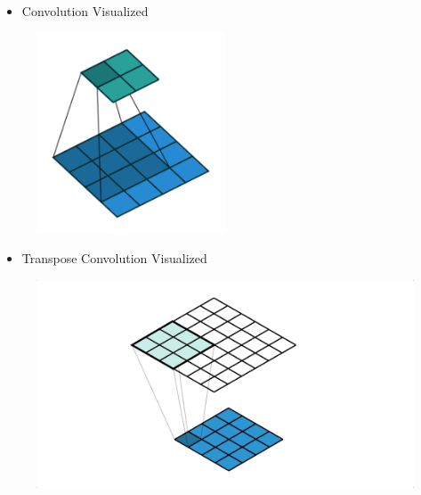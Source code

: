 \begin{frame}[allowframebreaks]

\begin{itemize}
    \item Convolution Visualized
\end{itemize}

\begin{figure}[H]
    \centering
    \includegraphics[width=0.5\textwidth]{.././assets/8.15.gif}
\end{figure}

\begin{itemize}
    \item Transpose Convolution Visualized
\end{itemize}

\begin{figure}[H]
    \centering
    \includegraphics[width=1.0\textwidth]{.././assets/8.16.gif}
\end{figure}

\end{frame}

